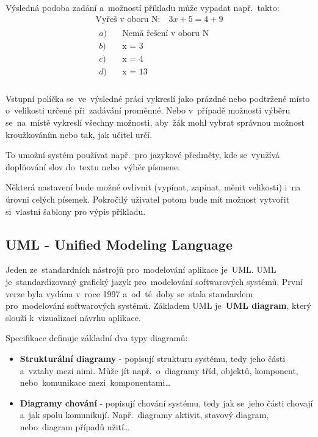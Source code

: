 \documentclass[14pt,a4paper]{article}
\begin{document}
        Výsledná podoba zadání a~možností příkladu může vypadat např.~takto:
        \begin{align*}
            \text{Vyřeš v oboru N:} \quad 3x + 5 = 4 + 9 \\
            \begin{aligned}
                a) \quad &\text{Nemá řešení v oboru N} \\
                b) \quad &\text{x = 3} \\
                c) \quad &\text{x = 4} \\
                d) \quad &\text{x = 13} \\
            \end{aligned}
        \end{align*}

        Vstupní políčka se~ve~výsledné práci vykreslí jako prázdné nebo podtržené místo o~velikosti určené při~zadávání proměnné. Nebo v~případě možnosti výběru se~na~místě vykreslí všechny možnosti, aby~žák mohl vybrat správnou možnost kroužkováním nebo tak, jak učitel určí.
        
        To umožní systém používat např.~pro jazykové předměty, kde se~využívá doplňování slov do~textu nebo~výběr písmene.

        Některá nastavení bude možné ovlivnit (vypínat, zapínat, měnit velikosti) i~na úrovni celých písemek. Pokročilý uživatel potom bude mít možnost vytvořit si~vlastní šablony pro výpis příkladu.

        \subsection{UML - Unified Modeling Language}
        Jeden ze~standardních nástrojů pro~modelování aplikace je~\textsc{UML}. \textsc{UML} je~standardizovaný grafický jazyk pro~modelování softwarových systémů. První verze byla vydána v~roce 1997 a~od~té~doby se~stala standardem pro~modelování softwarových systémů.
        Základem \textsc{UML} je~\textbf{UML diagram}, který slouží k~vizualizaci návrhu aplikace. \parencite{uml:diagram}
        
        Specifikace definuje základní dva typy diagramů:
        \begin{itemize}
            \item \textbf{Strukturální diagramy} - popisují strukturu systému, tedy jeho části a~vztahy mezi nimi. Může jít např.~o~diagramy tříd, objektů, komponent, nebo~komunikace mezi~komponentami\dots
            \item \textbf{Diagramy chování} - popisují chování systému, tedy jak se~jeho části chovají a~jak spolu komunikují. Např.~diagramy aktivit, stavový diagram, nebo~diagram případů užití\dots
        \end{itemize}
\end{document}
